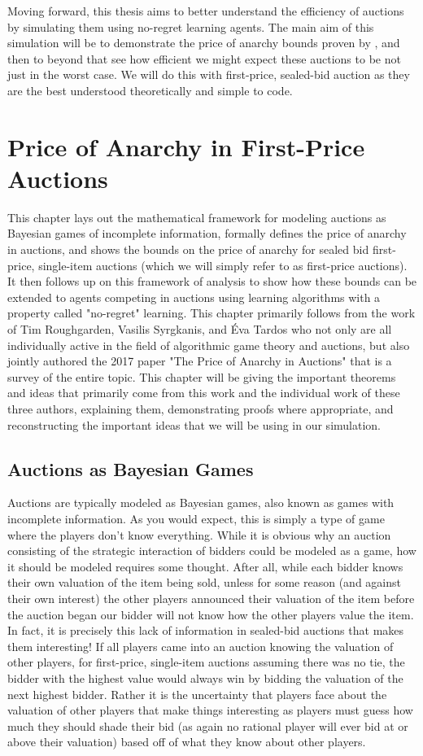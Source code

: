 \documentclass[12pt,twoside]{reedthesis}
\begin{document}
Moving forward, this thesis aims to better understand the efficiency of auctions by simulating them using no-regret learning agents. The main aim of this simulation will be to demonstrate the price of anarchy bounds proven by \cite{Roughgarden2017}, and then to beyond that see how efficient we might expect these auctions to be not just in the worst case. We will do this with first-price, sealed-bid auction as they are the best understood theoretically and simple to code.

\chapter{Price of Anarchy in First-Price Auctions}
This chapter lays out the mathematical framework for modeling auctions as Bayesian games of incomplete information, formally defines the price of anarchy in auctions, and shows the bounds on the price of anarchy for sealed bid first-price, single-item auctions (which we will simply refer to as first-price auctions). It then follows up on this framework of analysis to show how these bounds can be extended to agents competing in auctions using learning algorithms with a property called "no-regret" learning. This chapter primarily follows from the work of Tim Roughgarden, Vasilis Syrgkanis, and \'Eva Tardos who not only are all individually active in the field of algorithmic game theory and auctions, but also jointly authored the 2017 paper "The Price of Anarchy in Auctions" that is a survey of the entire topic. This chapter will be giving the important theorems and ideas that primarily come from this work and the individual work of these three authors, explaining them, demonstrating proofs where appropriate, and reconstructing the important ideas that we will be using in our simulation.   

\section{Auctions as Bayesian Games}
Auctions are typically modeled as Bayesian games, also known as games with incomplete information. As you would expect, this is simply a type of game where the players don't know everything. While it is obvious why an auction consisting of the strategic interaction of bidders could be modeled as a game, how it should be modeled requires some thought. After all, while each bidder knows their own valuation of the item being sold, unless for some reason (and against their own interest) the other players announced their valuation of the item before the auction began our bidder will not know how the other players value the item. In fact, it is precisely this lack of information in sealed-bid auctions that makes them interesting! If all players came into an auction knowing the valuation of other players, for first-price, single-item auctions assuming there was no tie, the bidder with the highest value would always win by bidding the valuation of the next highest bidder. Rather it is the uncertainty that players face about the valuation of other players that make things interesting as players must guess how much they should shade their bid (as again no rational player will ever bid at or above their valuation) based off of what they know about other players. 
\end{document}
